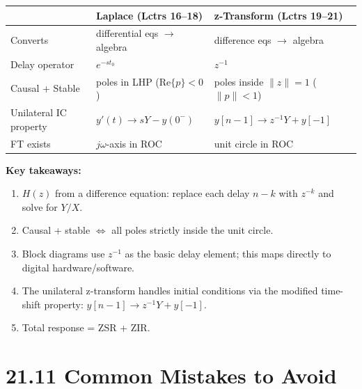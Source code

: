 \documentclass[11pt]{article}
\begin{document}
\begin{center}
\begin{tabular}{|l|l|l|}
\hline
\textbf{} & \textbf{Laplace (Lctrs 16–18)} & \textbf{z-Transform (Lctrs 19–21)} \\
\hline
Converts & differential eqs $\to$ algebra & difference eqs $\to$ algebra \\
\hline
Delay operator & $e^{-s t_0}$ & $z^{-1}$ \\
\hline
Causal + Stable & poles in LHP ($\mathrm{Re}\{p\} < 0$) & poles inside $\|z\| = 1$ ($\|p\| < 1$) \\
\hline
Unilateral IC property & $y'(t) \to sY - y(0^-)$ & $y[n-1] \to z^{-1} Y + y[-1]$ \\
\hline
FT exists & $j\omega$-axis in ROC & unit circle in ROC \\
\hline
\end{tabular}
\end{center}

\textbf{Key takeaways:}

\begin{enumerate}
  \item $H(z)$ from a difference equation: replace each delay $n - k$ with $z^{-k}$ and solve for $Y/X$.
  \item Causal + stable $\iff$ all poles strictly inside the unit circle.
  \item Block diagrams use $z^{-1}$ as the basic delay element; this maps directly to digital hardware/software.
  \item The unilateral z-transform handles initial conditions via the modified time-shift property: $y[n-1] \to z^{-1} Y + y[-1]$.
  \item Total response = ZSR + ZIR.
\end{enumerate}

\section*{21.11 Common Mistakes to Avoid}
\end{document}
